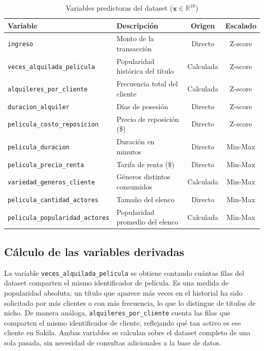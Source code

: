 \documentclass[12pt, a4paper]{report}
\newcommand{\variable}[1]{\texttt{\small #1}}
\begin{document}
\begin{table}[H]
\centering
\caption{Variables predictoras del dataset ($\mathbf{x} \in \mathbb{R}^{10}$)}
\label{tab:features}
\begin{tabular}{@{} l p{5cm} c c @{}}
\toprule
\textbf{Variable} & \textbf{Descripción} & \textbf{Origen} & \textbf{Escalado} \\
\midrule
\variable{ingreso}                       & Monto de la transacción          & Directo   & Z-score \\
\variable{veces\_alquilada\_pelicula}    & Popularidad histórica del título  & Calculada & Z-score \\
\variable{alquileres\_por\_cliente}      & Frecuencia total del cliente      & Calculada & Z-score \\
\variable{duracion\_alquiler}            & Días de posesión                  & Directo   & Z-score \\
\variable{pelicula\_costo\_reposicion}   & Precio de reposición (\$)         & Directo   & Z-score \\
\variable{pelicula\_duracion}            & Duración en minutos               & Directo   & Min-Max \\
\variable{pelicula\_precio\_renta}       & Tarifa de renta (\$)              & Directo   & Min-Max \\
\variable{variedad\_generos\_cliente}    & Géneros distintos consumidos      & Calculada & Min-Max \\
\variable{pelicula\_cantidad\_actores}   & Tamaño del elenco                 & Directo   & Min-Max \\
\variable{pelicula\_popularidad\_actores}& Popularidad promedio del elenco   & Calculada & Min-Max \\
\bottomrule
\end{tabular}
\end{table}

\subsection{Cálculo de las variables derivadas}

La variable \variable{veces\_alquilada\_pelicula} se obtiene contando cuántas filas del dataset comparten el mismo identificador de película. Es una medida de popularidad absoluta: un título que aparece más veces en el historial ha sido solicitado por más clientes o con más frecuencia, lo que lo distingue de títulos de nicho. De manera análoga, \variable{alquileres\_por\_cliente} cuenta las filas que comparten el mismo identificador de cliente, reflejando qué tan activo es ese cliente en Sakila. Ambas variables se calculan sobre el dataset completo de una sola pasada, sin necesidad de consultas adicionales a la base de datos.
\end{document}
